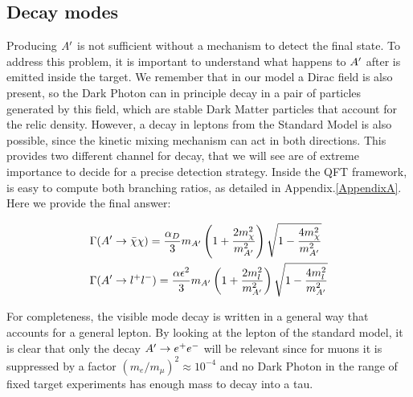\subsection{Decay modes}
\label{ch1:sec:dm-decay}

Producing $A'$ is not sufficient  without a mechanism to detect the final state. To address this problem, it is important to understand what happens to $A'$ after is emitted inside the target. We remember that in our model a Dirac field is also present, so the Dark Photon can in principle decay in a pair of particles generated by this field, which are stable Dark Matter particles that account for the relic density. However, a decay in leptons from the Standard Model is also possible, since the kinetic mixing mechanism can act in both directions. This provides two different channel for decay, that we will see are of extreme importance to decide for a precise detection strategy. Inside the QFT framework, is easy to compute both branching ratios, as detailed in Appendix.\ref{AppendixA}. Here we provide the final answer:

\begin{equation}
  \label{eq:dm-bratio}
  \begin{aligned}
    &\Gamma(A' \to \bar{\chi} \chi) = \frac{\alpha_D}{3} m_{A'} \left( 1 + \frac{2m^2_{\chi}}{m_{A'}^2}\right) \sqrt{1 - \frac{4m_{\chi}^2}{m^2_{A'}}}\\
    &\Gamma(A' \to l^+l^-) = \frac{\alpha \epsilon^2}{3} m_{A'} \left( 1 + \frac{2m^2_{l}}{m_{A'}^2}\right) \sqrt{1 - \frac{4m_{l}^2}{m^2_{A'}}}
  \end{aligned}
\end{equation}

For completeness, the visible mode decay is written in a general way that accounts for a general lepton. By looking at the lepton of the standard model, it is clear that only the decay $A' \to e^+e^-$ will be relevant since for muons it is suppressed by a factor $(m_e/m_{\mu})^2 \approx 10^{-4}$ and no Dark Photon in the range of fixed target experiments has enough mass to decay into a tau.

